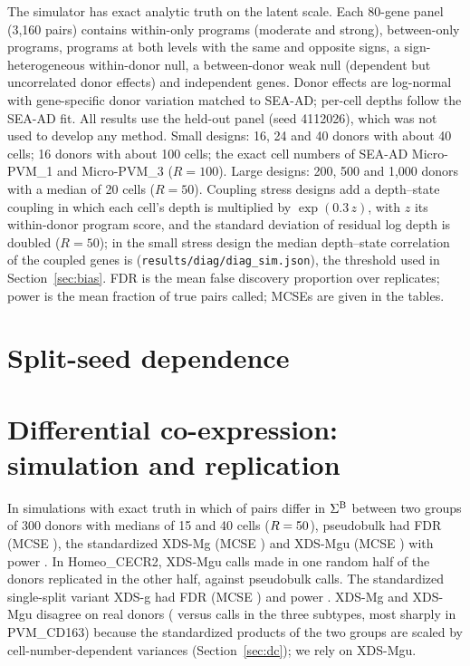 The simulator has exact analytic truth on the latent scale. Each 80-gene panel (3,160 pairs) contains within-only programs (moderate and strong), between-only programs, programs at both levels with the same and opposite signs, a sign-heterogeneous within-donor null, a between-donor weak null (dependent but uncorrelated donor effects) and independent genes. Donor effects are log-normal with gene-specific donor variation matched to SEA-AD; per-cell depths follow the SEA-AD fit. All results use the held-out panel (seed 4112026), which was not used to develop any method. Small designs: 16, 24 and 40 donors with about 40 cells; 16 donors with about 100 cells; the exact cell numbers of SEA-AD Micro-PVM\_1 and Micro-PVM\_3 ($R=100$). Large designs: 200, 500 and 1,000 donors with a median of 20 cells ($R=50$). Coupling stress designs add a depth--state coupling in which each cell's depth is multiplied by $\exp(0.3\,z)$, with $z$ its within-donor program score, and the standard deviation of residual log depth is doubled ($R=50$); in the small stress design the median depth--state correlation of the coupled genes is \CouplingStress{} (\texttt{results/diag/diag\_sim.json}), the threshold used in Section~\ref{sec:bias}. FDR is the mean false discovery proportion over replicates; power is the mean fraction of true pairs called; MCSEs are given in the tables.



\section{Split-seed dependence}\label{app:split}

\SplitText

\section{Differential co-expression: simulation and replication}\label{app:dc}

In simulations with exact truth in which \DCtwoAlt{} of \DCtwoPairs{} pairs differ in $\Sigma^{\mathrm{B}}$ between two groups of 300 donors with medians of 15 and 40 cells ($R=50$), pseudobulk had FDR \DCtwoFDRPB{} (MCSE \DCtwoFDRsePB), the standardized XDS-Mg \DCtwoFDRM{} (MCSE \DCtwoFDRseM) and XDS-Mgu \DCtwoFDRU{} (MCSE \DCtwoFDRseU) with power \DCtwoPowU. In Homeo\_CECR2, \DCthreeU{} XDS-Mgu calls made in one random half of the donors replicated in the other half, against \DCthreePB{} pseudobulk calls. The standardized single-split variant XDS-g had FDR \DCtwoFDRG{} (MCSE \DCtwoFDRseG) and power \DCtwoPowG. XDS-Mg and XDS-Mgu disagree on real donors (\DCrealM{} versus \DCrealU{} calls in the three subtypes, most sharply in PVM\_CD163) because the standardized products of the two groups are scaled by cell-number-dependent variances (Section~\ref{sec:dc}); we rely on XDS-Mgu.

